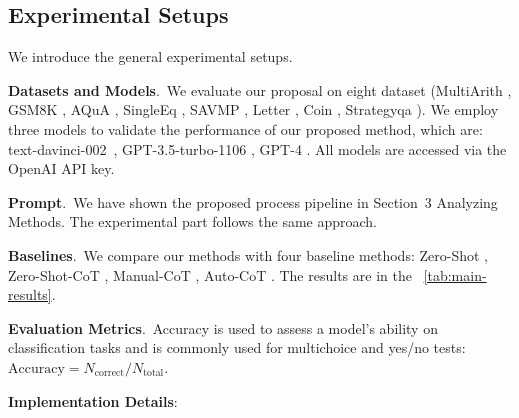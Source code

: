 \documentclass[11pt]{article}
\begin{document}
\subsection{Experimental Setups}
\label{section4.1}
We introduce the general experimental setups.

\noindent
\textbf{Datasets and Models}.\, We evaluate our proposal on eight dataset (MultiArith \cite{roy2015solving}, GSM8K \cite{cobbe2021training}, AQuA \cite{ling2017program}, SingleEq \cite{koncel2015parsing}, SAVMP \cite{patel2021nlp}, Letter \cite{wei2022chain}, Coin \cite{wei2022chain}, Strategyqa \cite{geva2021did}). We employ three models to validate the performance of our proposed method, which are: text-davinci-002~\cite{brown2020language}, GPT-3.5-turbo-1106 \cite{ouyang2022training}, GPT-4 \cite{openai2023gpt}.  All models are accessed via the OpenAI API key.

\vspace{2pt}
\noindent
\textbf{Prompt}.\, We have shown the proposed process pipeline in Section~3 Analyzing Methods. The experimental part follows the same approach.

\vspace{2pt}
\noindent
\textbf{Baselines}.\, We compare our methods with four baseline methods: Zero-Shot \cite{kojima2023large}, Zero-Shot-CoT \cite{kojima2023large}, Manual-CoT \cite{wei2022chain}, Auto-CoT \cite{zhang2022automatic}. The results are in the ~\autoref{tab:main-results}. 

\vspace{2pt}
\noindent
\textbf{Evaluation Metrics}.\,
Accuracy is used to assess a model's ability on classification tasks and is commonly used for multichoice and yes/no tests:
$
\text{Accuracy} = {N_{\text{correct}}}/{N_{\text{total}}}.
$

\vspace{2pt}
\noindent
\textbf{Implementation Details}:
\end{document}
